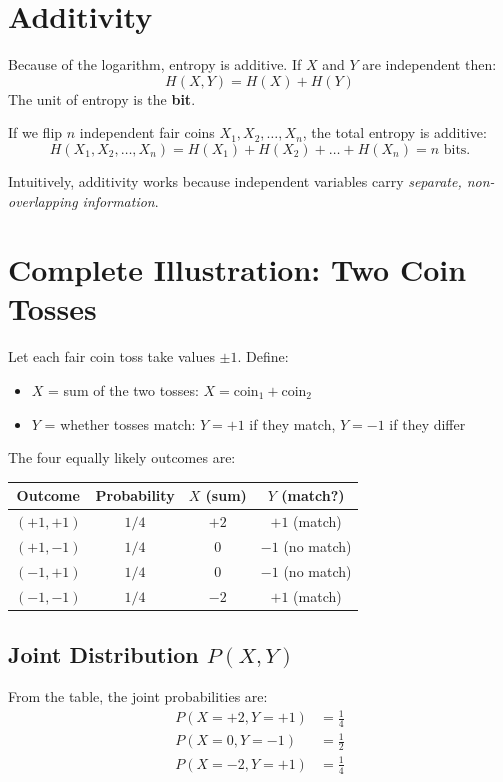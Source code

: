 \documentclass[11pt]{article}
\begin{document}
\section*{Additivity}

Because of the logarithm, entropy is additive. If $X$ and $Y$ are independent then:
\[
H(X, Y) = H(X) + H(Y)
\]
The unit of entropy is the \textbf{bit}.

If we flip $n$ independent fair coins $X_1, X_2, \dots, X_n$, the total entropy is additive:
\[
H(X_1, X_2, \dots, X_n) = H(X_1) + H(X_2) + \dots + H(X_n) = n \text{ bits}.
\]

Intuitively, additivity works because independent variables carry \emph{separate, non-overlapping information}. 

\section*{Complete Illustration: Two Coin Tosses}

Let each fair coin toss take values $\pm 1$. Define:
\begin{itemize}
    \item $X$ = sum of the two tosses: $X = \text{coin}_1 + \text{coin}_2$
    \item $Y$ = whether tosses match: $Y = +1$ if they match, $Y = -1$ if they differ
\end{itemize}

The four equally likely outcomes are:

\begin{center}
\begin{tabular}{cccc}
\toprule
Outcome & Probability & $X$ (sum) & $Y$ (match?) \\
\midrule
$(+1, +1)$ & $1/4$ & $+2$ & $+1$ (match) \\
$(+1, -1)$ & $1/4$ & $0$ & $-1$ (no match) \\
$(-1, +1)$ & $1/4$ & $0$ & $-1$ (no match) \\
$(-1, -1)$ & $1/4$ & $-2$ & $+1$ (match) \\
\bottomrule
\end{tabular}
\end{center}

\subsection*{Joint Distribution $P(X,Y)$}

From the table, the joint probabilities are:
\begin{align*}
P(X=+2, Y=+1) &= \tfrac{1}{4} \\
P(X=0, Y=-1) &= \tfrac{1}{2} \\
P(X=-2, Y=+1) &= \tfrac{1}{4}
\end{align*}
\end{document}
